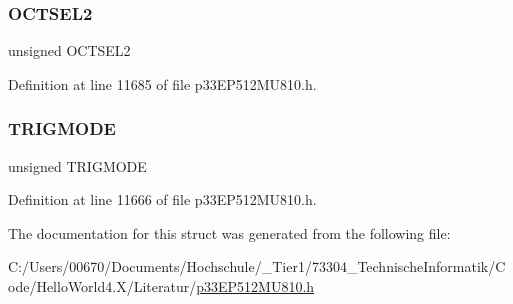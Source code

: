 \subsubsection{\texorpdfstring{O\+C\+T\+S\+E\+L2}{OCTSEL2}}
{\footnotesize\ttfamily unsigned O\+C\+T\+S\+E\+L2}



Definition at line 11685 of file p33\+E\+P512\+M\+U810.\+h.

\mbox{\label{structtag_o_c9_c_o_n1_b_i_t_s_a7a0057e0dca6e2663584b5b9e1da04c3}} 
\subsubsection{\texorpdfstring{T\+R\+I\+G\+M\+O\+DE}{TRIGMODE}}
{\footnotesize\ttfamily unsigned T\+R\+I\+G\+M\+O\+DE}



Definition at line 11666 of file p33\+E\+P512\+M\+U810.\+h.



The documentation for this struct was generated from the following file\+:\begin{DoxyCompactItemize}
\item 
C\+:/\+Users/00670/\+Documents/\+Hochschule/\+\_\+\+Tier1/73304\+\_\+\+Technische\+Informatik/\+Code/\+Hello\+World4.\+X/\+Literatur/\hyperlink{p33_e_p512_m_u810_8h}{p33\+E\+P512\+M\+U810.\+h}\end{DoxyCompactItemize}
